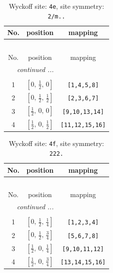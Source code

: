 \documentclass[fleqn,8pt]{jsarticle}
\begin{document}
\begin{longtable}{ccc}
\caption{Wyckoff site: {\tt 4e}, site symmetry: {\tt 2/m..}}
 \\
 \hline \hline
No. & position & mapping \\ \hline \endfirsthead

\multicolumn{2}{l}{\tablename\ \thetable{}} \\
 \hline \hline
No. & position & mapping \\ \hline \endhead

 \hline \hline
\multicolumn{2}{r}{\footnotesize\it continued ...} \\ \endfoot

 \hline \hline
\multicolumn{2}{r}{} \\ \endlastfoot

1 & $\left[ 0,\, \frac{1}{2},\, 0 \right]$ & {\tt [1,4,5,8]} \\ \hline
2 & $\left[ 0,\, \frac{1}{2},\, \frac{1}{2} \right]$ & {\tt [2,3,6,7]} \\ \hline
3 & $\left[ \frac{1}{2},\, 0,\, 0 \right]$ & {\tt [9,10,13,14]} \\ \hline
4 & $\left[ \frac{1}{2},\, 0,\, \frac{1}{2} \right]$ & {\tt [11,12,15,16]} \\
\end{longtable}
\renewcommand{\arraystretch}{1.2}
\begin{longtable}{ccc}
\caption{Wyckoff site: {\tt 4f}, site symmetry: {\tt 222.}}
 \\
 \hline \hline
No. & position & mapping \\ \hline \endfirsthead

\multicolumn{2}{l}{\tablename\ \thetable{}} \\
 \hline \hline
No. & position & mapping \\ \hline \endhead

 \hline \hline
\multicolumn{2}{r}{\footnotesize\it continued ...} \\ \endfoot

 \hline \hline
\multicolumn{2}{r}{} \\ \endlastfoot

1 & $\left[ 0,\, \frac{1}{2},\, \frac{1}{4} \right]$ & {\tt [1,2,3,4]} \\ \hline
2 & $\left[ 0,\, \frac{1}{2},\, \frac{3}{4} \right]$ & {\tt [5,6,7,8]} \\ \hline
3 & $\left[ \frac{1}{2},\, 0,\, \frac{1}{4} \right]$ & {\tt [9,10,11,12]} \\ \hline
4 & $\left[ \frac{1}{2},\, 0,\, \frac{3}{4} \right]$ & {\tt [13,14,15,16]} \\
\end{longtable}
\end{document}
